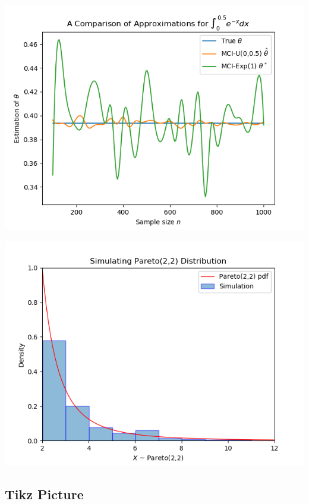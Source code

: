 \documentclass{article}
\begin{document}
\begin{minipage}{\textwidth}
	\begin{minipage}[b]{0.5\textwidth}
		\centering
		\includegraphics[scale=0.55]{../img/MCI_Results}
		\label{fig:somsubplot}
	\end{minipage}
	\begin{minipage}[b]{0.5\textwidth}
		\centering
		\includegraphics[scale=0.55]{../img/pareto}
		\label{fig:pcasubplot}
	\end{minipage}
\end{minipage}

\subsection{Tikz Picture}\label{subsec:tikz}
\end{document}
